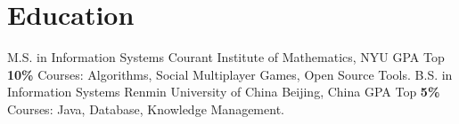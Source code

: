 \documentclass[11pt,a4paper,sans]{moderncv}   %
\begin{document}


\renewcommand{\baselinestretch}{1.25}
\section{Education}

{M.S. in Information Systems}
{Courant Institute of Mathematics, NYU}
{}{GPA Top \textbf{10\%}}
{Courses: Algorithms, Social Multiplayer Games, Open Source Tools.}
{B.S. in Information Systems}
{Renmin University of China}
{Beijing, China}
{GPA Top \textbf{5\%}}
{Courses: Java, Database, Knowledge Management.}

\closesection{}                   %
\renewcommand{\listitemsymbol}{-} %
\end{document}
